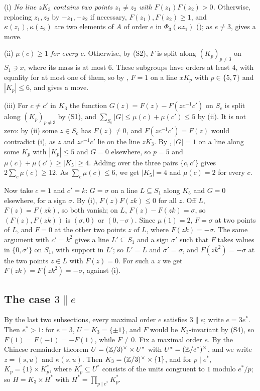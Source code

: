 (i) \emph{No line $zK_{3}$ contains two points $z_{1}\ne z_{2}$ with
$F(z_{1})F(z_{2})>0$.} Otherwise, replacing $z_{1},z_{2}$ by $-z_{1},-z_{2}$
if necessary, $F(z_{1}),F(z_{2})\ge1$, and $\kappa(z_{1}),\kappa(z_{2})$ are
two elements of $A$ of order $e$ in $\Phi_{3}(\kappa z_{1})$
(); as $e\ne3$,  gives a move.

(ii) \emph{$\mu(c)\ge1$ for every $c$.} Otherwise, by (S2), $F$ is split
along $(K_{p})_{p\ne3}$ on $S_{1}\ni x$, where its mass is at most $6$. These
subgroups have orders at least $4$, with equality for at most one of them,
so by , $F=1$ on a line $xK_{p}$ with $p\in\{5,7\}$ and
$|K_{p}|\le6$, and  gives a move.

(iii) For $c\ne c'$ in $K_{3}$ the function $G(z)=F(z)-F(zc^{-1}c')$ on
$S_{c}$ is split along $(K_{p})_{p\ne3}$ by (S1), and $\sum_{S_{c}}|G|\le
\mu(c)+\mu(c')\le5$ by (ii). It is not zero: by (ii) some $z\in S_{c}$ has
$F(z)\ne0$, and $F(zc^{-1}c')=F(z)$ would contradict (i), as $z$ and
$zc^{-1}c'$ lie on the line $zK_{3}$. By , $|G|=1$ on a line
along some $K_{p}$ with $|K_{p}|\le5$ and $G=0$ elsewhere, so $p=5$ and
$\mu(c)+\mu(c')\ge|K_{5}|\ge4$. Adding over the three pairs $\{c,c'\}$ gives
$2\sum_{c}\mu(c)\ge12$. As $\sum_{c}\mu(c)\le6$, we get $|K_{5}|=4$ and
$\mu(c)=2$ for every $c$.

Now take $c=1$ and $c'=k$: $G=\sigma$ on a line $L\subseteq S_{1}$ along
$K_{5}$ and $G=0$ elsewhere, for a sign $\sigma$. By (i), $F(z)F(zk)\le0$
for all $z$. Off $L$, $F(z)=F(zk)$, so both vanish; on $L$,
$F(z)-F(zk)=\sigma$, so $(F(z),F(zk))$ is $(\sigma,0)$ or $(0,-\sigma)$.
Since $\mu(1)=2$, $F=\sigma$ at two points of $L$, and $F=0$ at the other
two points $z$ of $L$, where $F(zk)=-\sigma$. The same argument with
$c'=k^{2}$ gives a line $L'\subseteq S_{1}$ and a sign $\sigma'$ such that
$F$ takes values in $\{0,\sigma'\}$ on $S_{1}$, with support in $L'$; so
$L'=L$ and $\sigma'=\sigma$, and $F(zk^{2})=-\sigma$ at the two points $z\in
L$ with $F(z)=0$. For such a $z$ we get $F(zk)=F(zk^{2})=-\sigma$, against
(i).

\subsection{The case \texorpdfstring{$3\parallel e$}{3 || e}}
By the last two subsections, every maximal order $e$ satisfies
$3\parallel e$; write $e=3e^{*}$. Then $e^{*}>1$: for $e=3$,
$U=K_{3}=\{\pm1\}$, and $F$ would be $K_{3}$-invariant by (S4), so
$F(1)=F(-1)=-F(1)$, while $F\ne0$. Fix a maximal order $e$. By the Chinese
remainder theorem $U=(\mathbb{Z}/3)^{\times}\times U^{*}$ with
$U^{*}=(\mathbb{Z}/e^{*})^{\times}$, and we write $z=(s,u)$ and $\kappa(s,u)$. Then
$K_{3}=(\mathbb{Z}/3)^{\times}\times\{1\}$, and for $p\mid e^{*}$,
$K_{p}=\{1\}\times K^{*}_{p}$, where $K^{*}_{p}\subseteq U^{*}$ consists of
the units congruent to $1$ modulo $e^{*}/p$; so $H=K_{3}\times H^{*}$ with
$H^{*}=\prod_{p\mid e^{*}}K^{*}_{p}$.

